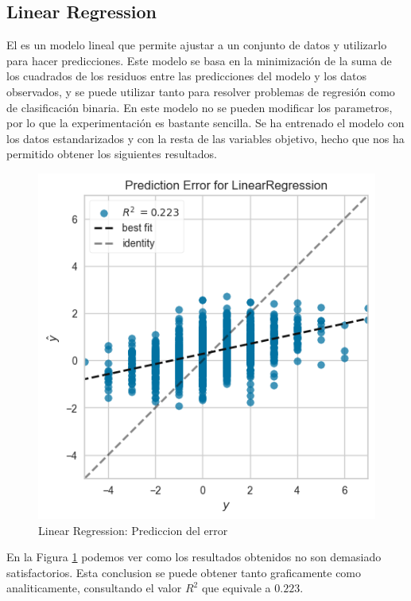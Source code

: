 \subsection{Linear Regression}

El \cite{Sklearn Linear Regression} es un modelo lineal que permite ajustar a un conjunto de datos y utilizarlo para hacer predicciones. Este modelo se basa en la minimización de la suma de los cuadrados de los residuos entre las predicciones del modelo y los datos observados, y se puede utilizar tanto para resolver problemas de regresión como de clasificación binaria. En este modelo no se pueden modificar los parametros, por lo que la experimentación es bastante sencilla. Se ha entrenado el modelo con los datos estandarizados y con la resta de las variables objetivo, hecho que nos ha permitido obtener los siguientes resultados.

\begin{figure}[H]
    \centering
    \includegraphics[width=\smallSize]{images/linearModelLinearRegression.png}
    \caption{Linear Regression: Prediccion del error}
    \label{Modelos-Lineales-Linear-Regression-Prediccion-Error}
\end{figure}

En la Figura \ref{Modelos-Lineales-Linear-Regression-Prediccion-Error} podemos ver como los resultados obtenidos no son demasiado satisfactorios. Esta conclusion se puede obtener tanto graficamente como analiticamente, consultando el valor $R^2$ que equivale a $0.223$. 
\newline

